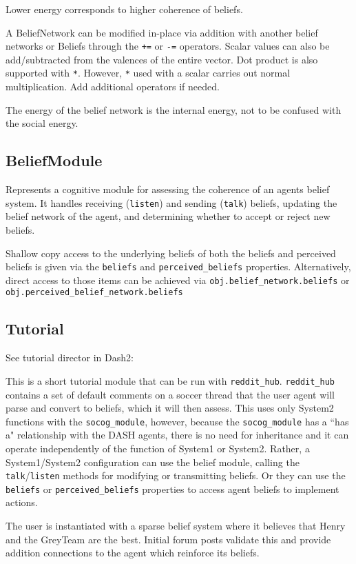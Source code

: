 \documentclass[11pt, a4paper]{article}
\begin{document}
Lower energy corresponds to higher coherence of beliefs.

A BeliefNetwork can be modified in-place via addition with another belief networks or Beliefs through the \texttt{+=} or \texttt{-=} operators. Scalar values can also be add/subtracted from the valences of the entire vector. Dot product is also supported with \texttt{*}. However, \texttt{*} used with a scalar carries out normal multiplication. Add additional operators if needed.

The energy of the belief network is the internal energy, not to be confused with the social energy.

\subsection{BeliefModule}
Represents a cognitive module for assessing the coherence of an agents belief system. It handles receiving (\texttt{listen}) and sending (\texttt{talk}) beliefs, updating the belief network of the agent, and determining whether to  accept or reject new beliefs.

Shallow copy access to the underlying beliefs of both the beliefs and perceived beliefs is given via the \texttt{beliefs} and \texttt{perceived\_beliefs} properties. Alternatively, direct access to those items can be achieved via \texttt{obj.belief\_network.beliefs} or \texttt{obj.perceived\_belief\_network.beliefs}

\subsection{Tutorial}
See tutorial director in Dash2:

This is a short tutorial module that can be run with \texttt{reddit\_hub}.
\texttt{reddit\_hub} contains a set of default comments on a soccer thread that
the user agent will parse and convert to beliefs, which it will then
assess. This uses only System2 functions with the \texttt{socog\_module}, however,
because the \texttt{socog\_module} has a ``has a" relationship with the DASH agents,
there is no need for inheritance and it can operate independently of the
function of System1 or System2. Rather, a System1/System2 configuration
can use the belief module, calling the \texttt{talk}/\texttt{listen} methods for modifying or
transmitting beliefs. Or they can use the \texttt{beliefs} or \texttt{perceived\_beliefs}
properties to access agent beliefs to implement actions.

The user is instantiated with a sparse belief system where it believes that
Henry and the GreyTeam are the best. Initial forum posts validate this and
provide addition connections to the agent which reinforce its beliefs.
\end{document}
